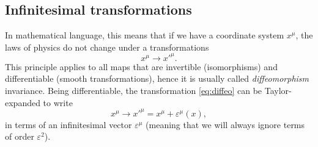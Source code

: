 \documentclass[a4paper,12pt]{article}
\numberwithin{equation}{section}
\begin{document}
\subsection{Infinitesimal transformations}

In mathematical language, this means that if we have a coordinate system $x^\mu$, the laws of physics do not change under a transformations 
\begin{equation}
	x^\mu \to x'^\mu.
	\label{eq:diffeo}
\end{equation}
This principle applies to all maps that are invertible (isomorphisms) and differentiable (smooth transformations), hence it is usually called \emph{diffeomorphism} invariance.
Being differentiable, the transformation \eqref{eq:diffeo} can be Taylor-expanded to write
\begin{equation}
	x^\mu \to x'^\mu = x^\mu + \varepsilon^\mu(x),
	\label{eq:diffeo:infinitesimal}
\end{equation}
in terms of an infinitesimal vector $\varepsilon^\mu$ (meaning that we will always ignore terms of order $\varepsilon^2$).
\end{document}
